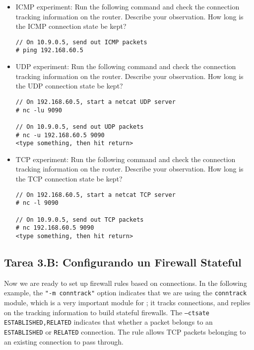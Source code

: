 \begin{itemize}
\item ICMP experiment: Run the following command and 
check the connection tracking information on the router. Describe
your observation. How long is the ICMP connection state be kept? 

\begin{lstlisting}
// On 10.9.0.5, send out ICMP packets
# ping 192.168.60.5
\end{lstlisting}

\item UDP experiment: Run the following command and 
check the connection tracking information on the router. Describe
your observation. How long is the UDP connection state be kept? 


\begin{lstlisting}
// On 192.168.60.5, start a netcat UDP server
# nc -lu 9090

// On 10.9.0.5, send out UDP packets  
# nc -u 192.168.60.5 9090
<type something, then hit return>
\end{lstlisting}


\item TCP experiment: Run the following command and 
check the connection tracking information on the router. Describe
your observation. How long is the TCP connection state be kept? 

\begin{lstlisting}
// On 192.168.60.5, start a netcat TCP server
# nc -l 9090

// On 10.9.0.5, send out TCP packets 
# nc 192.168.60.5 9090
<type something, then hit return>
\end{lstlisting}

\end{itemize}
 


\subsection{Tarea 3.B: Configurando un Firewall Stateful} 


Now we are ready to set up firewall rules based on connections. 
In the following example, 
the \texttt{"-m conntrack"} option indicates that we are using the \texttt{conntrack} module,
which is a very important module for \iptables; it tracks connections, and
\iptables replies on the tracking information to build stateful firewalls. 
The \texttt{--ctsate ESTABLISHED,RELATED} indicates that whether a packet
belongs to an \texttt{ESTABLISHED} or \texttt{RELATED} connection.
The rule allows TCP packets belonging to an existing connection to 
pass through. 

